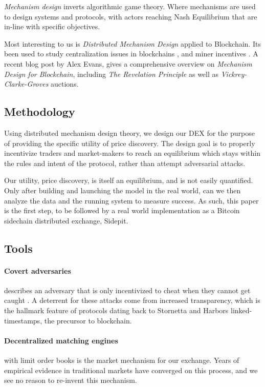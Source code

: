 \documentclass[12pt]{article}
\begin{document}
\emph{Mechanism design} inverts algorithmic game theory. Where mechanisms are used to design systems and protocols, with actors reaching Nash Equilibrium that are in-line with specific objectives. \cite{nisan_2007} \cite{Shneidman} \cite{DBLP:journals/corr/abs-1905-08595}

Most interesting to us is \emph{Distributed Mechanism Design} applied to Blockchain. Its been used to study centralization issues in blockchains \cite{Ray}, and miner incentives \cite{Chen}.  A recent blog post by Alex Evans, gives a comprehensive overview on \emph{Mechanism Design for Blockchain}, including  \emph{The Revelation Principle} as well as \emph{Vickrey-Clarke-Groves} auctions. \cite{Evans}

\subsection* {Methodology}
Using distributed mechanism design theory, we design our DEX for the purpose of providing the specific utility of price discovery. The design goal is to properly incentivize traders and market-makers to reach an equilibrium which stays within the rules and intent of the protocol, rather than attempt adversarial attacks.

Our utility, price discovery, is itself an equilibrium, and is not easily quantified. Only after building and launching the model in the real world, can we then analyze the data and the running system to measure success. As such, this paper is the first step, to be followed by a real world implementation as a Bitcoin sidechain distributed exchange, Sidepit. 

\subsection* {Tools}
\paragraph{Covert adversaries} describes an adversary that is only incentivized to cheat when they cannot get caught \cite{Aumann}. A deterrent for these attacks come from increased transparency, which is the hallmark feature of protocols dating back to Stornetta and Harbors linked-timestamps, the precursor to blockchain. \cite{10.1007/3-540-38424-3_32} 

\paragraph{Decentralized matching engines} with limit order books is the market mechanism for our exchange. Years of empirical evidence in traditional markets have converged on this process, and we see no reason to re-invent this mechanism. 
\end{document}

